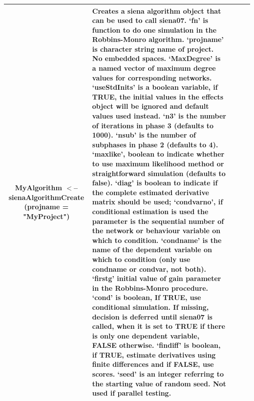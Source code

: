 \documentclass[a4paper,fleqn,11pt]{article}
\newcommand{\+}{\, + \,}
\begin{document}
\begin{landscape}
\begin{small}
\begin{longtable}{c | p{3.8cm} | p{4.5cm} | p{4.0cm} | p{7.4cm} }
MyAlgorithm $<$-- sienaAlgorithmCreate \newline
(projname = \newline
"MyProject") & Creates a siena algorithm
object that can be used to call \textsf{siena07}. `fn' is function to do one
simulation in the Robbins-Monro algorithm.
`projname' is character string name of
project. No embedded spaces. `MaxDegree' is a named vector of maximum degree
values for corresponding networks. `useStdInits' is a boolean variable, if
TRUE, the initial values in the effects object will be ignored and default
values used instead. `n3' is the number of iterations in phase 3 (defaults to
1000). `nsub' is the number of subphases in phase 2 (defaults to 4).
`maxlike', boolean to indicate whether to use maximum likelihood method or
straightforward simulation (defaults to false). `diag' is boolean to indicate
if the complete estimated derivative matrix should be used; `condvarno', if
conditional estimation is used the parameter is the sequential number of the
network or behaviour variable on which to condition. `condname' is the name
of the dependent variable on which to condition (only use condname or condvar,
not both). `firstg' initial value of gain parameter in the Robbins-Monro
procedure. `cond' is boolean, If TRUE, use conditional simulation. If
missing, decision is deferred until \textsf{siena07} is called, when it is set to TRUE
if there is only one dependent variable, FALSE otherwise. `findiff' is
boolean, if TRUE, estimate derivatives using finite differences and if FALSE,
use scores. `seed' is an integer referring to the starting value of random
seed. Not used if parallel
testing.\\
\hline


\end{longtable}
\end{small}
\end{landscape}
\end{document}
